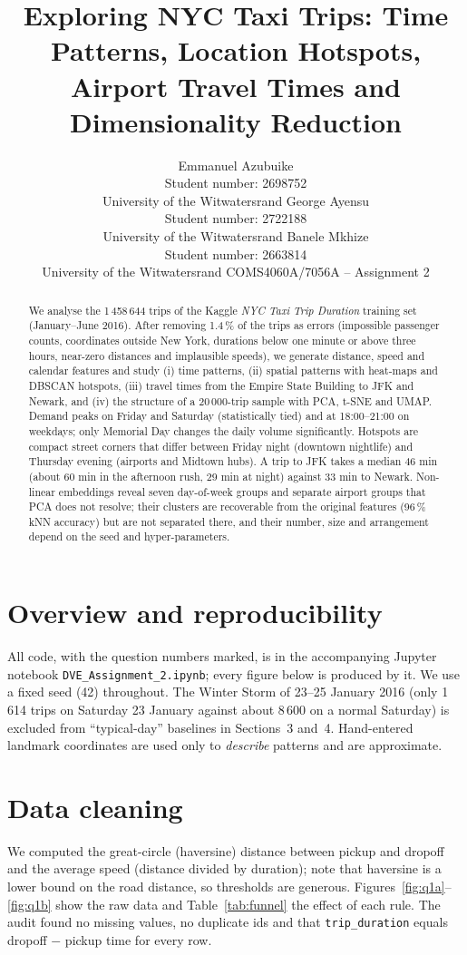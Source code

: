 \documentclass{article}
\title{Exploring NYC Taxi Trips: Time Patterns, Location Hotspots, Airport Travel Times and Dimensionality Reduction}
\author{%
  Emmanuel Azubuike \\
  Student number: 2698752 \\
  University of the Witwatersrand
  \And
  George Ayensu \\
  Student number: 2722188 \\
  University of the Witwatersrand
  \And
  Banele Mkhize \\
  Student number: 2663814 \\
  University of the Witwatersrand
  \AND
  COMS4060A/7056A -- Assignment 2
}
\begin{document}
\maketitle

\begin{abstract}
We analyse the 1\,458\,644 trips of the Kaggle \emph{NYC Taxi Trip Duration} training set (January--June 2016). After removing 1.4\,\% of the trips as errors (impossible passenger counts, coordinates outside New York, durations below one minute or above three hours, near-zero distances and implausible speeds), we generate distance, speed and calendar features and study (i) time patterns, (ii) spatial patterns with heat-maps and DBSCAN hotspots, (iii) travel times from the Empire State Building to JFK and Newark, and (iv) the structure of a 20\,000-trip sample with PCA, t-SNE and UMAP. Demand peaks on Friday and Saturday (statistically tied) and at 18:00--21:00 on weekdays; only Memorial Day changes the daily volume significantly. Hotspots are compact street corners that differ between Friday night (downtown nightlife) and Thursday evening (airports and Midtown hubs). A trip to JFK takes a median 46 min (about 60 min in the afternoon rush, 29 min at night) against 33 min to Newark. Non-linear embeddings reveal seven day-of-week groups and separate airport groups that PCA does not resolve; their clusters are recoverable from the original features (96\,\% kNN accuracy) but are not separated there, and their number, size and arrangement depend on the seed and hyper-parameters.
\end{abstract}

\section*{Overview and reproducibility}
All code, with the question numbers marked, is in the accompanying Jupyter notebook \texttt{DVE\_Assignment\_2.ipynb}; every figure below is produced by it. We use a fixed seed (42) throughout. The Winter Storm of 23--25 January 2016 (only 1\,614 trips on Saturday 23 January against about 8\,600 on a normal Saturday) is excluded from ``typical-day'' baselines in Sections~3 and~4. Hand-entered landmark coordinates are used only to \emph{describe} patterns and are approximate.

\section{Data cleaning}
We computed the great-circle (haversine) distance between pickup and dropoff and the average speed (distance divided by duration); note that haversine is a lower bound on the road distance, so thresholds are generous. Figures~\ref{fig:q1a}--\ref{fig:q1b} show the raw data and Table~\ref{tab:funnel} the effect of each rule. The audit found no missing values, no duplicate ids and that \texttt{trip\_duration} equals dropoff $-$ pickup time for every row.
\end{document}
